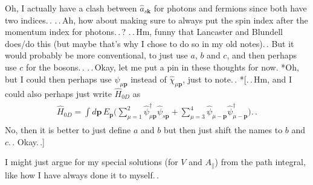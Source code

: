 \documentclass{report}
\begin{document}
Oh, I actually have a clash between $\hat a_{s \boldsymbol{k}}$ for photons and fermions since both have two indices.\,. .\,.\,Ah, how about making sure to always put the spin index after the momentum index for photons.\,.\,? .\,.\,Hm, funny that Lancaster and Blundell does/do this (but maybe that's why I chose to do so in my old notes).\,. But it would probably be more conventional, to just use $a$, $b$ and $c$, and then perhaps use $c$ for the bosons.\,. .\,.\,Okay, let me put a pin in these thoughts for now. *Oh, but I could then perhaps use $\hat \psi_{\mu \boldsymbol{p}}$ instead of $\hat \chi_{\mu \boldsymbol{p}}$, just to note.\,. *[.\,.\,Hm, and I could also perhaps just write $\hat H_{0 D}$ as
\begin{align}
\begin{aligned}
	\hat H_{0 D} = 
		\int d\boldsymbol{p}\, E_{\boldsymbol{p}} \Big(
			\sum_{\mu=1}^2 \hat \psi^\dagger_{\mu \boldsymbol{p}} \hat \psi_{s \boldsymbol{p}} + 
			\sum_{\mu=3}^4 \hat \psi_{\mu -\boldsymbol{p}} \hat \psi^\dagger_{\mu -\boldsymbol{p}}
		\Big).\,.
	\label{H_0D_02}
\end{aligned}
\end{align}
No, then it is better to just define $a$ and $b$ but then just shift the names to $b$ and $c$.\,. Okay.\,.]

I might just argue for my special solutions (for $V$ and $A_\parallel$) from the path integral, like how I have always done it to myself.\,. 
\end{document}
